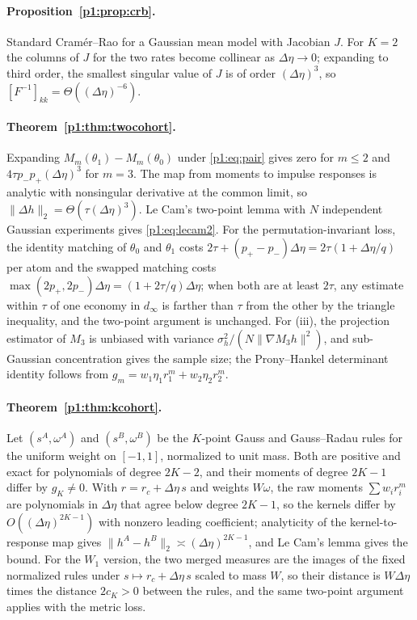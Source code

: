 \paragraph{Proposition~\ref{p1:prop:crb}.} Standard Cram\'er--Rao for a Gaussian mean model with Jacobian $J$. For $K=2$ the columns of $J$ for the two rates become collinear as $\Delta\eta\to0$; expanding to third order, the smallest singular value of $J$ is of order $(\Delta\eta)^3$, so $[F^{-1}]_{kk}=\Theta((\Delta\eta)^{-6})$.

\paragraph{Theorem~\ref{p1:thm:twocohort}.} Expanding $M_m(\theta_1)-M_m(\theta_0)$ under \eqref{p1:eq:pair} gives zero for $m\le2$ and $4\tau p_-p_+(\Delta\eta)^3$ for $m=3$. The map from moments to impulse responses is analytic with nonsingular derivative at the common limit, so $\|\Delta h\|_2=\Theta(\tau(\Delta\eta)^3)$. Le Cam's two-point lemma with $N$ independent Gaussian experiments gives \eqref{p1:eq:lecam2}. For the permutation-invariant loss, the identity matching of $\theta_0$ and $\theta_1$ costs $2\tau+(p_+-p_-)\Delta\eta=2\tau(1+\Delta\eta/q)$ per atom and the swapped matching costs $\max(2p_+,2p_-)\Delta\eta=(1+2\tau/q)\Delta\eta$; when both are at least $2\tau$, any estimate within $\tau$ of one economy in $d_\infty$ is farther than $\tau$ from the other by the triangle inequality, and the two-point argument is unchanged. For (iii), the projection estimator of $M_3$ is unbiased with variance $\sigma_h^2/(N\|\nabla M_3h\|^2)$, and sub-Gaussian concentration gives the sample size; the Prony--Hankel determinant identity follows from $g_m=w_1\eta_1r_1^m+w_2\eta_2r_2^m$.

\paragraph{Theorem~\ref{p1:thm:kcohort}.} Let $(s^A,\omega^A)$ and $(s^B,\omega^B)$ be the $K$-point Gauss and Gauss--Radau rules for the uniform weight on $[-1,1]$, normalized to unit mass. Both are positive and exact for polynomials of degree $2K-2$, and their moments of degree $2K-1$ differ by $g_K\neq0$. With $r=r_c+\Delta\eta\,s$ and weights $W\omega$, the raw moments $\sum w_ir_i^m$ are polynomials in $\Delta\eta$ that agree below degree $2K-1$, so the kernels differ by $O((\Delta\eta)^{2K-1})$ with nonzero leading coefficient; analyticity of the kernel-to-response map gives $\|h^A-h^B\|_2\asymp(\Delta\eta)^{2K-1}$, and Le Cam's lemma gives the bound. For the $W_1$ version, the two merged measures are the images of the fixed normalized rules under $s\mapsto r_c+\Delta\eta\,s$ scaled to mass $W$, so their distance is $W\Delta\eta$ times the distance $2c_K>0$ between the rules, and the same two-point argument applies with the metric loss.

